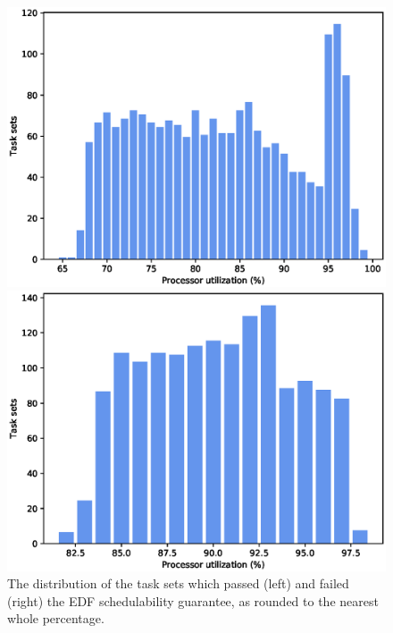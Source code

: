 \begin{figure}[htpb]
    \centering
    \hspace*{-1.6cm}
    \begin{minipage}{0.62\textwidth}
        \includegraphics[width=\textwidth]{figures/guarantee_passed_distribution.eps}
    \end{minipage}%
    \begin{minipage}{0.62\textwidth}
        \includegraphics[width=\textwidth]{figures/guarantee_failed_distribution.eps}
    \end{minipage}
    \caption{The distribution of the task sets which passed (left) and failed (right) the EDF schedulability guarantee, as rounded to the nearest whole percentage.}
    \label{fig:tasksetsdist}
\end{figure}

